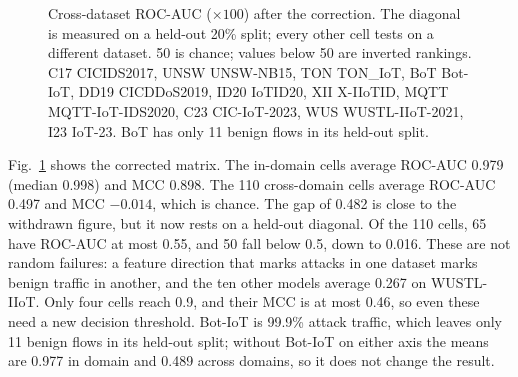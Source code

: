 \documentclass[conference]{IEEEtran}
\begin{document}
\begin{figure}[t]
\centering
{}
\caption{Cross-dataset ROC-AUC ($\times 100$) after the correction. The
diagonal is measured on a held-out 20\% split; every other cell tests on a
different dataset. 50 is chance; values below 50 are inverted rankings.
C17 CICIDS2017, UNSW UNSW-NB15, TON TON\_IoT, BoT Bot-IoT, DD19
CICDDoS2019, ID20 IoTID20, XII X-IIoTID, MQTT MQTT-IoT-IDS2020, C23
CIC-IoT-2023, WUS WUSTL-IIoT-2021, I23 IoT-23. BoT has only 11 benign flows
in its held-out split.}
\label{fig:auc}
\end{figure}

Fig.~\ref{fig:auc} shows the corrected matrix. The in-domain cells average
ROC-AUC 0.979 (median 0.998) and MCC 0.898. The 110 cross-domain cells
average ROC-AUC 0.497 and MCC $-0.014$, which is chance. The gap of 0.482 is
close to the withdrawn figure, but it now rests on a held-out diagonal. Of
the 110 cells, 65 have ROC-AUC at most 0.55, and 50 fall below 0.5, down to
0.016. These are not random failures: a feature direction that marks
attacks in one dataset marks benign traffic in another, and the ten other models
average 0.267 on WUSTL-IIoT. Only four cells reach 0.9, and their MCC is
at most 0.46, so even these need a new decision threshold. Bot-IoT is
99.9\% attack traffic, which leaves only 11 benign flows in its held-out
split; without Bot-IoT on either axis the means are 0.977 in domain and
0.489 across domains, so it does not change the result.
\end{document}
